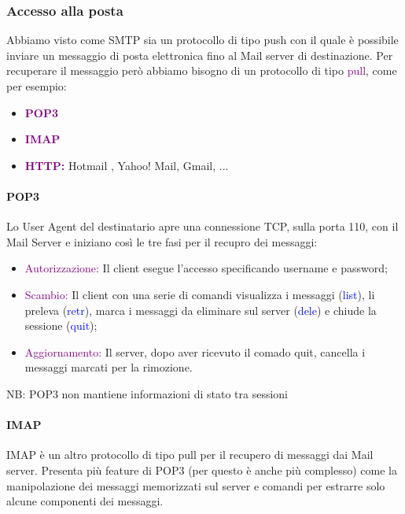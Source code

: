 \subsubsection{Accesso alla posta}
Abbiamo visto come SMTP sia un protocollo di tipo push con il quale è possibile inviare un messaggio di posta elettronica fino al Mail server di destinazione. 
Per recuperare il messaggio però abbiamo bisogno di un protocollo di tipo \textcolor{purple}{pull}, come per esempio:
\begin{itemize}
    \item \textbf{\textcolor{purple}{POP3}}
    \item \textbf{\textcolor{purple}{IMAP}}
    \item \textbf{\textcolor{purple}{HTTP:}} Hotmail , Yahoo! Mail, Gmail, ...
\end{itemize}

\paragraph{POP3} Lo User Agent del destinatario apre una connessione TCP, sulla porta 110, con il Mail Server e iniziano così le tre fasi per il recupro dei messaggi:
\begin{itemize}
    \item \textcolor{purple}{Autorizzazione:} Il client esegue l'accesso specificando username e password;
    \item \textcolor{purple}{Scambio:} Il client con una serie di comandi visualizza i messaggi (\textcolor{blue}{list}), li preleva (\textcolor{blue}{retr}), marca i messaggi da eliminare sul server (\textcolor{blue}{dele}) e chiude la sessione (\textcolor{blue}{quit});
    \item \textcolor{purple}{Aggiornamento: } Il server, dopo aver ricevuto il comado quit, cancella i messaggi marcati per la rimozione.
\end{itemize}

NB: POP3 non mantiene informazioni di stato tra sessioni

\paragraph{IMAP}
IMAP è un altro protocollo di tipo pull per il recupero di messaggi dai Mail server. 
Presenta più feature di POP3 (per questo è anche più complesso) come la manipolazione dei messaggi memorizzati sul server e comandi per estrarre solo alcune componenti dei messaggi.

